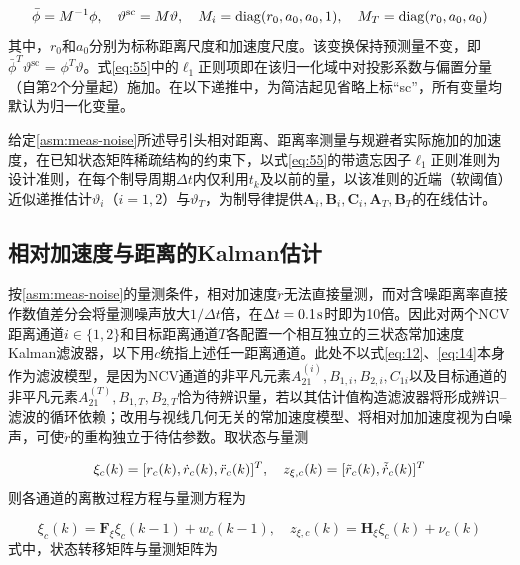 \begin{equation}
\label{eq:56}
\bar{\phi} = {M^{ - 1}}\phi ,\quad {\vartheta ^{{\text{sc}}}} = M\vartheta ,\quad {M_i} = \operatorname{diag}({r_0},{a_0},{a_0},1),\quad {M_T} = \operatorname{diag}({r_0},{a_0},{a_0})
\end{equation}
其中，${r_0}$和${a_0}$分别为标称距离尺度和加速度尺度。该变换保持预测量不变，即$\bar{\phi}^{T}{\vartheta ^{{\text{sc}}}}{\text{ = }}{\phi ^T}\vartheta $。式\eqref{eq:55}中的${\ell _1}$正则项即在该归一化域中对投影系数与偏置分量（自第2个分量起）施加。在以下递推中，为简洁起见省略上标“sc”，所有变量均默认为归一化变量。

\begin{problem}[结构稀疏参数辨识]
\label{prb:id}
给定\cref{asm:meas-noise}所述导引头相对距离、距离率测量与规避者实际施加的加速度，在已知状态矩阵稀疏结构的约束下，以式\eqref{eq:55}的带遗忘因子${\ell _1}$正则准则为设计准则，在每个制导周期$\Delta t$内仅利用${t_k}$及以前的量，以该准则的近端（软阈值）近似递推估计${\vartheta _i}$（$i = 1,2$）与${\vartheta _T}$，为制导律提供${{\mathbf{A}}_i},{{\mathbf{B}}_i},{{\mathbf{C}}_i},{{\mathbf{A}}_T},{{\mathbf{B}}_T}$的在线估计。
\end{problem}

\subsection{相对加速度与距离的Kalman估计}
\label{subsec:kf}
按\cref{asm:meas-noise}的量测条件，相对加速度$\ddot r$无法直接量测，而对含噪距离率直接作数值差分会将量测噪声放大$1/\Delta t$倍，在$\Delta t = 0.1{\kern 1pt} {\text{s}}$时即为10倍。因此对两个NCV距离通道$i \in \{1,2\}$和目标距离通道$T$各配置一个相互独立的三状态常加速度Kalman滤波器，以下用$c$统指上述任一距离通道。此处不以式\eqref{eq:12}、\eqref{eq:14}本身作为滤波模型，是因为NCV通道的非平凡元素$A_{21}^{(i)},B_{1,i},B_{2,i},C_{1i}$以及目标通道的非平凡元素$A_{21}^{(T)},B_{1,T},B_{2,T}$恰为待辨识量，若以其估计值构造滤波器将形成辨识--滤波的循环依赖；改用与视线几何无关的常加速度模型、将相对加加速度视为白噪声，可使$\ddot r$的重构独立于待估参数。取状态与量测

\begin{equation}
\label{eq:62}
{\xi _c}(k) = {[{r_c}(k),{\dot r_c}(k),{\ddot r_c}(k)]^T},\quad {z_{\xi ,c}}(k) = {[\tilde{r}_{c}(k),\tilde{\dot{r}}_{c}(k)]^T}
\end{equation}
则各通道的离散过程方程与量测方程为

\begin{equation}
\label{eq:62b}
{\xi _c}(k) = {{\mathbf{F}}_\xi }{\xi _c}(k - 1) + {w_c}(k - 1),\quad {z_{\xi ,c}}(k) = {{\mathbf{H}}_\xi }{\xi _c}(k) + {\nu _c}(k)
\end{equation}
式中，状态转移矩阵与量测矩阵为

